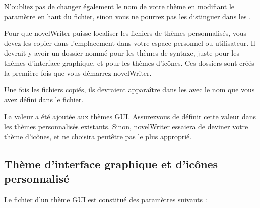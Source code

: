 \documentclass[a4paper,11pt,french]{sphinxmanual}
\begin{document}
\sphinxAtStartPar
N’oubliez pas de changer également le nom de votre thème en modifiant le paramètre  en haut du fichier, sinon vous ne pourrez pas les distinguer dans les .

\sphinxAtStartPar
Pour que novelWriter puisse localiser les fichiers de thèmes personnalisés, vous devez les copier dans l’emplacement {\hyperref[\detokenize{tech_locations:a-locations-data}]{}} dans votre espace personnel ou utilisateur. Il devrait y avoir un dossier nommé  pour les thèmes de syntaxe, juste  pour les thèmes d’interface graphique, et  pour les thèmes d’icônes. Ces dossiers sont créés la première fois que vous démarrez novelWriter.

\sphinxAtStartPar
Une fois les fichiers copiés, ils devraient apparaître dans les  avec le nom que vous avez défini dans le fichier.

\sphinxAtStartPar
{}La valeur  a été ajoutée aux thèmes GUI. Assurez\sphinxhyphen{}vous de définir cette valeur dans les thèmes personnalisés existants. Sinon, novelWriter essaiera de deviner votre thème d’icônes, et ne choisira peut\sphinxhyphen{}être pas le plus approprié.


\subsection{Thème d’interface graphique et d’icônes personnalisé}
\label{\detokenize{more_customise:custom-gui-and-icons-theme}}
\sphinxAtStartPar
Le fichier  d’un thème GUI est constitué des paramètres suivants :
\end{document}
